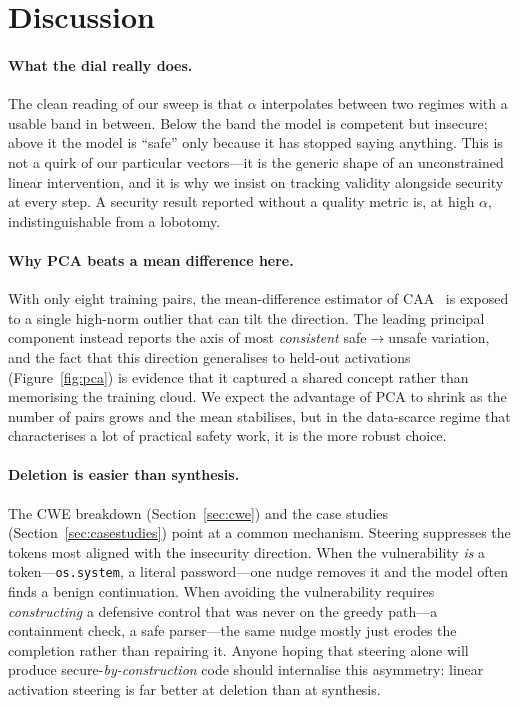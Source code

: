 \documentclass[11pt,a4paper]{article}
\begin{document}
\section{Discussion}
\label{sec:discussion}

\paragraph{What the dial really does.}
The clean reading of our sweep is that $\alpha$ interpolates between two regimes with a usable band in between. Below the band the model is competent but insecure; above it the model is ``safe'' only because it has stopped saying anything. This is not a quirk of our particular vectors---it is the generic shape of an unconstrained linear intervention, and it is why we insist on tracking validity alongside security at every step. A security result reported without a quality metric is, at high $\alpha$, indistinguishable from a lobotomy.

\paragraph{Why PCA beats a mean difference here.}
With only eight training pairs, the mean-difference estimator of CAA~\cite{rimsky2024caa} is exposed to a single high-norm outlier that can tilt the direction. The leading principal component instead reports the axis of most \emph{consistent} safe$\rightarrow$unsafe variation, and the fact that this direction generalises to held-out activations (Figure~\ref{fig:pca}) is evidence that it captured a shared concept rather than memorising the training cloud. We expect the advantage of PCA to shrink as the number of pairs grows and the mean stabilises, but in the data-scarce regime that characterises a lot of practical safety work, it is the more robust choice.

\paragraph{Deletion is easier than synthesis.}
The CWE breakdown (Section~\ref{sec:cwe}) and the case studies (Section~\ref{sec:casestudies}) point at a common mechanism. Steering suppresses the tokens most aligned with the insecurity direction. When the vulnerability \emph{is} a token---\texttt{os.system}, a literal password---one nudge removes it and the model often finds a benign continuation. When avoiding the vulnerability requires \emph{constructing} a defensive control that was never on the greedy path---a containment check, a safe parser---the same nudge mostly just erodes the completion rather than repairing it. Anyone hoping that steering alone will produce secure-\emph{by-construction} code should internalise this asymmetry: linear activation steering is far better at deletion than at synthesis.
\end{document}
